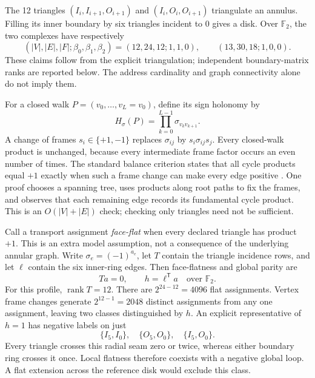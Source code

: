 \documentclass[11pt,a4paper]{article}
\theoremstyle{definition}\newtheorem{definition}[theorem]{Definition}
\begin{document}
The 12 triangles $(I_i,I_{i+1},O_{i+1})$ and $(I_i,O_i,O_{i+1})$ triangulate an annulus. Filling its inner boundary by six triangles incident to $0$ gives a disk. Over $\mathbb F_2$, the two complexes have respectively
\begin{equation}
 (|V|,|E|,|F|;\beta_0,\beta_1,\beta_2)
 =(12,24,12;1,1,0),\qquad(13,30,18;1,0,0).
 \label{eq:annulusdisk}
\end{equation}
These claims follow from the explicit triangulation; independent boundary-matrix ranks are reported below. The address cardinality and graph connectivity alone do not imply them.

For a closed walk $P=(v_0,\ldots,v_L=v_0)$, define its sign holonomy by
\begin{equation}
 H_\sigma(P)=\prod_{k=0}^{L-1}\sigma_{v_kv_{k+1}}.
 \label{eq:signholonomy}
\end{equation}
A change of frames $s_i\in\{+1,-1\}$ replaces $\sigma_{ij}$ by $s_i\sigma_{ij}s_j$. Every closed-walk product is unchanged, because every intermediate frame factor occurs an even number of times. The standard balance criterion states that all cycle products equal $+1$ exactly when such a frame change can make every edge positive \cite{zaslavsky1982}. One proof chooses a spanning tree, uses products along root paths to fix the frames, and observes that each remaining edge records its fundamental cycle product. This is an $O(|V|+|E|)$ check; checking only triangles need not be sufficient.

Call a transport assignment \emph{face-flat} when every declared triangle has product $+1$. This is an extra model assumption, not a consequence of the underlying annular graph. Write $\sigma_e=(-1)^{a_e}$, let $T$ contain the triangle incidence rows, and let $\ell$ contain the six inner-ring edges. Then face-flatness and global parity are
\begin{equation}
 Ta=0,\qquad h=\ell^{\mathsf T}a\quad\text{over }\mathbb F_2.
 \label{eq:flatparity}
\end{equation}
For this profile, $\operatorname{rank}T=12$. There are $2^{24-12}=4096$ flat assignments. Vertex frame changes generate $2^{12-1}=2048$ distinct assignments from any one assignment, leaving two classes distinguished by $h$. An explicit representative of $h=1$ has negative labels on just
\[
 \{I_5,I_0\},\quad\{O_5,O_0\},\quad\{I_5,O_0\}.
\]
Every triangle crosses this radial seam zero or twice, whereas either boundary ring crosses it once. Local flatness therefore coexists with a negative global loop. A flat extension across the reference disk would exclude this class.
\end{document}
